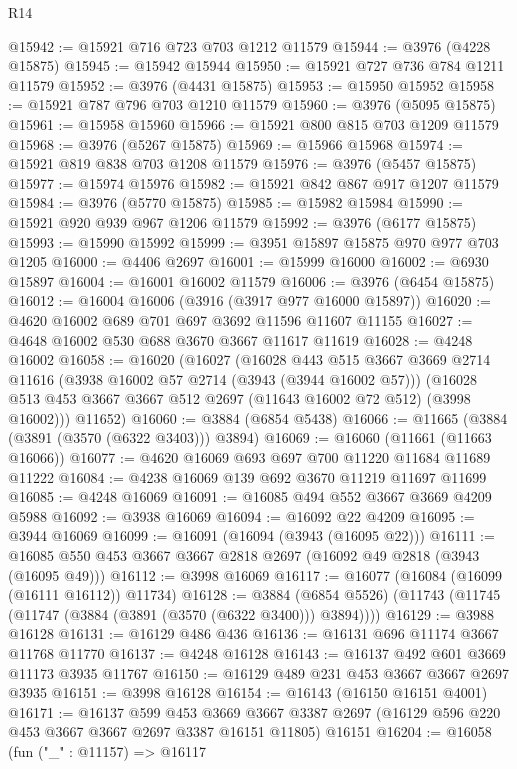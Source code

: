 \begin{lexlean}{R14}
\begin{coremodule}
@15942 := @15921 @716 @723 @703 @1212 @11579
@15944 := @3976 (@4228 @15875)
@15945 := @15942 @15944
@15950 := @15921 @727 @736 @784 @1211 @11579
@15952 := @3976 (@4431 @15875)
@15953 := @15950 @15952
@15958 := @15921 @787 @796 @703 @1210 @11579
@15960 := @3976 (@5095 @15875)
@15961 := @15958 @15960
@15966 := @15921 @800 @815 @703 @1209 @11579
@15968 := @3976 (@5267 @15875)
@15969 := @15966 @15968
@15974 := @15921 @819 @838 @703 @1208 @11579
@15976 := @3976 (@5457 @15875)
@15977 := @15974 @15976
@15982 := @15921 @842 @867 @917 @1207 @11579
@15984 := @3976 (@5770 @15875)
@15985 := @15982 @15984
@15990 := @15921 @920 @939 @967 @1206 @11579
@15992 := @3976 (@6177 @15875)
@15993 := @15990 @15992
@15999 := @3951 @15897 @15875 @970 @977 @703 @1205
@16000 := @4406 @2697
@16001 := @15999 @16000
@16002 := @6930 @15897
@16004 := @16001 @16002 @11579
@16006 := @3976 (@6454 @15875)
@16012 := @16004 @16006 (@3916 (@3917 @977 @16000 @15897))
@16020 := @4620 @16002 @689 @701 @697 @3692 @11596 @11607 @11155
@16027 := @4648 @16002 @530 @688 @3670 @3667 @11617 @11619
@16028 := @4248 @16002
@16058 := @16020
    (@16027
      (@16028
        @443
        @515
        @3667
        @3669
        @2714
        @11616
        (@3938 @16002 @57 @2714 (@3943 (@3944 @16002 @57)))
        (@16028 @513 @453 @3667 @3667 @512 @2697 (@11643 @16002 @72 @512) (@3998 @16002)))
      @11652)
@16060 := @3884 (@6854 @5438)
@16066 := @11665 (@3884 (@3891 (@3570 (@6322 @3403))) @3894)
@16069 := @16060 (@11661 (@11663 @16066))
@16077 := @4620 @16069 @693 @697 @700 @11220 @11684 @11689 @11222
@16084 := @4238 @16069 @139 @692 @3670 @11219 @11697 @11699
@16085 := @4248 @16069
@16091 := @16085 @494 @552 @3667 @3669 @4209 @5988
@16092 := @3938 @16069
@16094 := @16092 @22 @4209
@16095 := @3944 @16069
@16099 := @16091 (@16094 (@3943 (@16095 @22)))
@16111 := @16085 @550 @453 @3667 @3667 @2818 @2697 (@16092 @49 @2818 (@3943 (@16095 @49)))
@16112 := @3998 @16069
@16117 := @16077 (@16084 (@16099 (@16111 @16112)) @11734)
@16128 := @3884 (@6854 @5526) (@11743 (@11745 (@11747 (@3884 (@3891 (@3570 (@6322 @3400))) @3894))))
@16129 := @3988 @16128
@16131 := @16129 @486 @436
@16136 := @16131 @696 @11174 @3667 @11768 @11770
@16137 := @4248 @16128
@16143 := @16137 @492 @601 @3669 @11173 @3935 @11767
@16150 := @16129 @489 @231 @453 @3667 @3667 @2697 @3935
@16151 := @3998 @16128
@16154 := @16143 (@16150 @16151 @4001)
@16171 := @16137
    @599
    @453
    @3669
    @3667
    @3387
    @2697
    (@16129 @596 @220 @453 @3667 @3667 @2697 @3387 @16151 @11805)
    @16151
@16204 := @16058
    (fun ("_" : @11157) =>
    @16117

\end{coremodule}
\end{lexlean}
